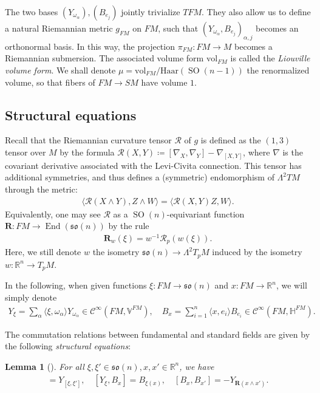 \documentclass[12pt]{amsart}
\numberwithin{numbering}{section}
\theoremstyle{plain}
\newtheorem{lem}[numbering]{Lemma}
\theoremstyle{definition}
\theoremstyle{remark}
\numberwithin{equation}{section}
\DeclareMathOperator{\End}{End}
\DeclareMathOperator{\SO}{SO}
\newcommand{\pfm}{\pi_{FM}}
\newcommand{\rfm}{\mathbf{R}}
\newcommand{\R}{\mathbb{R}}
\newcommand{\frk}[1]{\mathfrak{#1}}
\begin{document}
\smallskip 

The two bases $(Y_{\omega_\alpha}), (B_{e_j})$ jointly trivialize $TFM$. They also allow us to define a natural Riemannian metric $g_{FM}$ on $FM$, such that ${(Y_{\omega_\alpha}, B_{e_j})}_{\alpha, j}$ becomes an orthonormal basis. In this way, the projection $\pfm: FM \to M$ becomes a Riemannian submersion. The associated volume form $\mathrm{vol}_{FM}$ is called the \emph{Liouville volume form}. We shall denote $\mu = \mathrm{vol}_{FM} / \mathrm{Haar}(\SO(n-1))$ the renormalized volume, so that fibers of $FM \to SM$ have volume $1$.

\subsection{Structural equations} \label{sec:levi_civita:struct}

Recall that the Riemannian curvature tensor $\mathcal{R}$ of $g$ is defined as the $(1, 3)$ tensor over $M$ by the formula $\mathcal{R}(X, Y) \coloneq [\nabla_X, \nabla_Y] - \nabla_{[X, Y]}$, where $\nabla$ is the covariant derivative associated with the Levi-Civita connection. This tensor has additional symmetries, and thus defines a (symmetric) endomorphism of $\Lambda^2 TM$ through the metric:
\begin{align}
   \langle \mathcal{R}(X \wedge Y), Z \wedge W \rangle = \langle \mathcal{R}(X, Y) Z, W \rangle.
\end{align}
Equivalently, one may see $\mathcal{R}$ as a $\SO(n)$-equivariant function $\rfm: FM \to \End(\frk{so}(n))$ by the rule 
\begin{align}
   \rfm_w(\xi) = w^{-1} \mathcal{R}_p(w(\xi)).
\end{align}
Here, we still denote $w$ the isometry $\frk{so}(n) \to \Lambda^2 T_p M$ induced by the isometry $w: \R^n \to T_p M$.

In the following, when given functions $\xi: FM \to \frk{so}(n)$ and $x: FM \to \R^n$, we will simply denote 
\begin{align}
Y_\xi = \sum_\alpha \langle \xi, \omega_\alpha \rangle Y_{\omega_\alpha} \in \mathcal{C}^\infty(FM, \mathbb{V}^{FM}), \quad B_x = \sum_{i=1}^n \langle x, e_i \rangle B_{e_i} \in \mathcal{C}^\infty(FM, \mathbb{H}^{FM}). \label{eq:notation}
\end{align}

The commutation relations between fundamental and standard fields are given by the following \emph{structural equations}:
\begin{lem}[{\cite[Lemma 2.1]{cekic2025pestov}}] 
For all $\xi, \xi' \in \frk{so}(n), x, x' \in \R^n$, we have 
\begin{align}
   [Y_{\xi}, Y_{\xi'}] = Y_{[\xi, \xi']}, \quad [Y_\xi, B_x] = B_{\xi(x)}, \quad [B_x, B_{x'}] = - Y_{\rfm(x \wedge x')}. \label{eq:eq_struct}
\end{align}
\end{lem}
\end{document}
